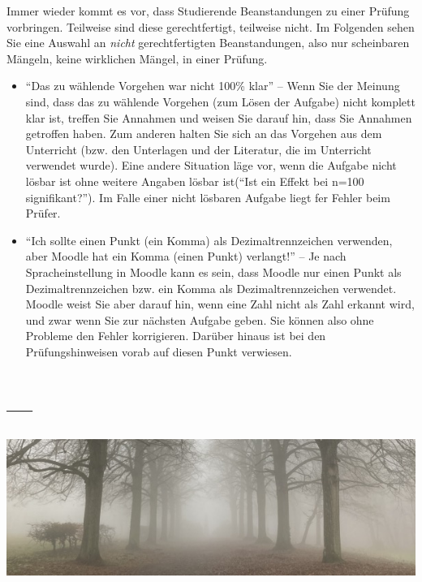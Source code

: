 \documentclass[
  a4paper,
  DIV=11]{scrreprt}
\theoremstyle{definition}
\theoremstyle{remark}
\begin{document}
Immer wieder kommt es vor, dass Studierende Beanstandungen zu einer
Prüfung vorbringen. Teilweise sind diese gerechtfertigt, teilweise
nicht. Im Folgenden sehen Sie eine Auswahl an \emph{nicht}
gerechtfertigten Beanstandungen, also nur scheinbaren Mängeln, keine
wirklichen Mängel, in einer Prüfung.

\begin{itemize}
\item
  ``Das zu wählende Vorgehen war nicht 100\% klar'' -- Wenn Sie der
  Meinung sind, dass das zu wählende Vorgehen (zum Lösen der Aufgabe)
  nicht komplett klar ist, treffen Sie Annahmen und weisen Sie darauf
  hin, dass Sie Annahmen getroffen haben. Zum anderen halten Sie sich an
  das Vorgehen aus dem Unterricht (bzw. den Unterlagen und der
  Literatur, die im Unterricht verwendet wurde). Eine andere Situation
  läge vor, wenn die Aufgabe nicht lösbar ist ohne weitere Angaben
  lösbar ist(``Ist ein Effekt bei n=100 signifikant?''). Im Falle einer
  nicht lösbaren Aufgabe liegt fer Fehler beim Prüfer.
\item
  ``Ich sollte einen Punkt (ein Komma) als Dezimaltrennzeichen
  verwenden, aber Moodle hat ein Komma (einen Punkt) verlangt!'' -- Je
  nach Spracheinstellung in Moodle kann es sein, dass Moodle nur einen
  Punkt als Dezimaltrennzeichen bzw. ein Komma als Dezimaltrennzeichen
  verwendet. Moodle weist Sie aber darauf hin, wenn eine Zahl nicht als
  Zahl erkannt wird, und zwar wenn Sie zur nächsten Aufgabe geben. Sie
  können also ohne Probleme den Fehler korrigieren. Darüber hinaus ist
  bei den Prüfungshinweisen vorab auf diesen Punkt verwiesen.
\end{itemize}

\hypertarget{section}{%
\section{---}\label{section}}

\includegraphics{./img/outro-01.jpg}

\end{document}
